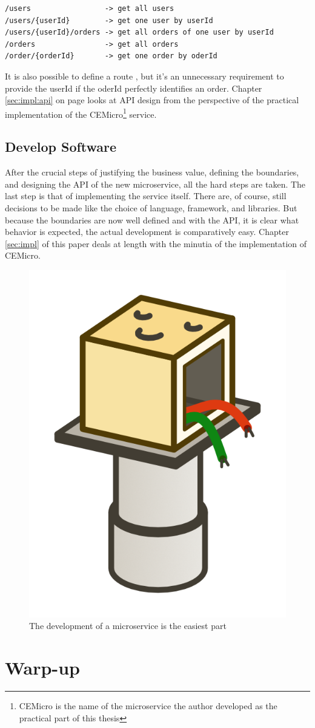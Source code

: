 \begin{lstlisting}
/users                 -> get all users
/users/{userId}        -> get one user by userId
/users/{userId}/orders -> get all orders of one user by userId
/orders                -> get all orders
/order/{orderId}       -> get one order by oderId
\end{lstlisting}

It is also possible to define a route , but it's an unnecessary requirement to provide the userId if the oderId perfectly identifies an order. Chapter \ref{sec:impl:api} on page \pageref{sec:impl:api} looks at API design from the perspective of the practical implementation of the CEMicro\footnote{CEMicro is the name of the microservice the author developed as the practical part of this thesis} service.


\subsection{Develop Software}

After the crucial steps of justifying the business value, defining the boundaries, and designing the API of the new microservice, all the hard steps are taken. The last step is that of implementing the service itself. There are, of course, still decisions to be made like the choice of language, framework, and libraries. But because the boundaries are now well defined and with the API, it is clear what behavior is expected, the actual development is comparatively easy. Chapter \ref{sec:impl} of this paper deals at length with the minutia of the implementation of CEMicro.

\begin{figure}[ht]
  \centering
  \includegraphics[width=0.2\linewidth]{assets/illustration-microservice-development.png}
  \caption{The development of a microservice is the easiest part}
\end{figure}



\section{Warp-up}

